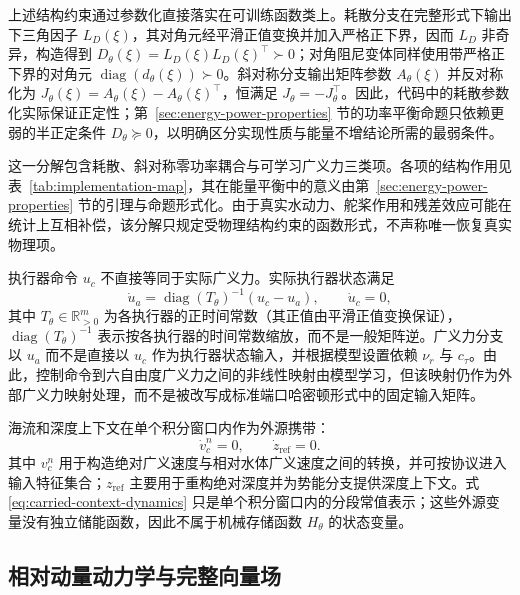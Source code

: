 \documentclass[UTF8,zihao=-4]{ctexrep}
\newcommand{\R}{\mathbb{R}}
\newcommand{\diag}{\operatorname{diag}}
\begin{document}
上述结构约束通过参数化直接落实在可训练函数类上。耗散分支在完整形式下输出下三角因子 \(L_D(\xi)\)，其对角元经平滑正值变换并加入严格正下界，因而 \(L_D\) 非奇异，构造得到 \(D_\theta(\xi)=L_D(\xi)L_D(\xi)^\top\succ0\)；对角阻尼变体同样使用带严格正下界的对角元 \(\diag(d_\theta(\xi))\succ0\)。斜对称分支输出矩阵参数 \(A_\theta(\xi)\) 并反对称化为 \(J_\theta(\xi)=A_\theta(\xi)-A_\theta(\xi)^\top\)，恒满足 \(J_\theta=-J_\theta^\top\)。因此，代码中的耗散参数化实际保证正定性；第~\ref{sec:energy-power-properties} 节的功率平衡命题只依赖更弱的半正定条件 \(D_\theta\succeq0\)，以明确区分实现性质与能量不增结论所需的最弱条件。

这一分解包含耗散、斜对称零功率耦合与可学习广义力三类项。各项的结构作用见表~\ref{tab:implementation-map}，其在能量平衡中的意义由第~\ref{sec:energy-power-properties} 节的引理与命题形式化。由于真实水动力、舵桨作用和残差效应可能在统计上互相补偿，该分解只规定受物理结构约束的函数形式，不声称唯一恢复真实物理项。

执行器命令 \(u_c\) 不直接等同于实际广义力。实际执行器状态满足
\begin{equation}
  \dot u_a=\operatorname{diag}(T_\theta)^{-1}(u_c-u_a),
  \qquad
  \dot u_c=0,
  \label{eq:actuator-dynamics}
\end{equation}
其中 \(T_\theta\in\R_{>0}^m\) 为各执行器的正时间常数（其正值由平滑正值变换保证），\(\operatorname{diag}(T_\theta)^{-1}\) 表示按各执行器的时间常数缩放，而不是一般矩阵逆。广义力分支以 \(u_a\) 而不是直接以 \(u_c\) 作为执行器状态输入，并根据模型设置依赖 \(\nu_r\) 与 \(c_\tau\)。由此，控制命令到六自由度广义力之间的非线性映射由模型学习，但该映射仍作为外部广义力映射处理，而不是被改写成标准端口哈密顿形式中的固定输入矩阵。

海流和深度上下文在单个积分窗口内作为外源携带：
\begin{equation}
  \dot v_c^n=0,\qquad
  \dot z_{\mathrm{ref}}=0 .
  \label{eq:carried-context-dynamics}
\end{equation}
其中 \(v_c^n\) 用于构造绝对广义速度与相对水体广义速度之间的转换，并可按协议进入输入特征集合；\(z_{\mathrm{ref}}\) 主要用于重构绝对深度并为势能分支提供深度上下文。式 \eqref{eq:carried-context-dynamics} 只是单个积分窗口内的分段常值表示；这些外源变量没有独立储能函数，因此不属于机械存储函数 \(H_\theta\) 的状态变量。

\subsection{相对动量动力学与完整向量场}
\end{document}
